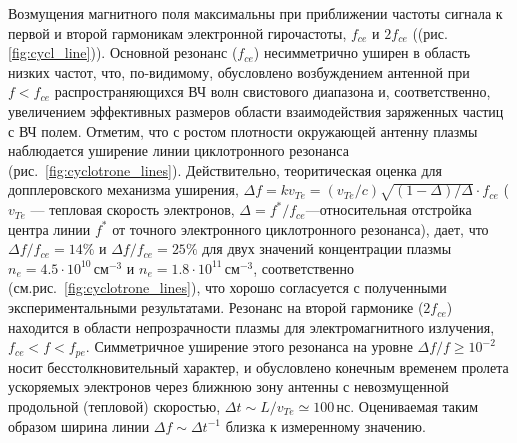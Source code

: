 \documentclass[autoref,10pt]{disser}
\begin{document}
Возмущения магнитного поля максимальны при приближении частоты сигнала к первой   и второй   гармоникам электронной гирочастоты, $f_{ce}$ и $2f_{ce}$ (\mbox{(рис.\ref{fig:cycl_line})}). Основной резонанс ($f_{ce}$) несимметрично уширен в область низких частот, что, по-видимому, обусловлено возбуждением антенной при $f<f_{ce}$ распространяющихся ВЧ волн свистового диапазона и, соответственно, увеличением эффективных размеров области взаимодействия заряженных частиц с ВЧ полем. 
Отметим, что с ростом плотности окружающей антенну плазмы наблюдается уширение линии циклотронного резонанса (\mbox{рис.~\ref{fig:cyclotrone_lines}}). Действительно, теоритическая оценка для допплеровского механизма уширения, $\Delta{}f=kv_{Te}=(v_{Te}/c)\sqrt{(1-\Delta{})/\Delta{}}\cdot{}f_{ce}$ ($v_{Te}$ --- тепловая скорость электронов, $\Delta{}=f^{*}/f_{ce}$---относительная отстройка центра линии $f^{*}$  от точного электронного циклотронного резонанса), дает, что $\Delta{}f/{}f_{ce} = 14\%$ и $\Delta{}f/f_{ce} = 25\%$ для двух значений концентрации плазмы $n_{e}=4.5\cdot{}10^{10}$\,см$^{-3}$ и $n_{e}=1.8\cdot{}10^{11}$\,см$^{-3}$, соответственно (см.\mbox{рис.~\ref{fig:cyclotrone_lines}}), что хорошо согласуется с полученными экспериментальными результатами.
Резонанс на второй гармонике ($2f_{ce}$) находится в области непрозрачности плазмы для электромагнитного излучения, $f_{ce}<f<f_{pe}$. Симметричное уширение этого резонанса на уровне $\Delta f/f\ge 10^{-2}$ носит бесстолкновительный характер, и обусловлено конечным временем пролета ускоряемых электронов через ближнюю зону антенны с невозмущенной продольной (тепловой) скоростью, $\Delta t\sim L/v_{Te}\simeq 100$\,нс. Оцениваемая таким образом ширина линии $\Delta f \sim \Delta t^{-1}$ близка к измеренному значению. 
\end{document}
